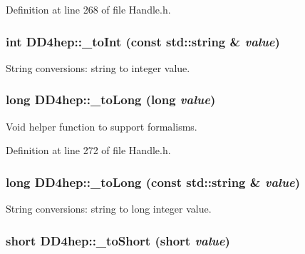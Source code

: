 Definition at line 268 of file Handle.h.\hypertarget{group___d_d4_h_e_p___g_e_o_m_e_t_r_y_ga6222fc401a48bcb4a2c176291bf4821b}{
\subsubsection[{\_\-toInt}]{\setlength{\rightskip}{0pt plus 5cm}int DD4hep::\_\-toInt (const std::string \& {\em value})}}
\label{group___d_d4_h_e_p___g_e_o_m_e_t_r_y_ga6222fc401a48bcb4a2c176291bf4821b}


String conversions: string to integer value. \hypertarget{group___d_d4_h_e_p___g_e_o_m_e_t_r_y_ga23a2ee3f07c47743d8a313babfb82841}{
\subsubsection[{\_\-toLong}]{\setlength{\rightskip}{0pt plus 5cm}long DD4hep::\_\-toLong (long {\em value})}}
\label{group___d_d4_h_e_p___g_e_o_m_e_t_r_y_ga23a2ee3f07c47743d8a313babfb82841}


Void helper function to support formalisms. 

Definition at line 272 of file Handle.h.\hypertarget{group___d_d4_h_e_p___g_e_o_m_e_t_r_y_ga76414f0a43017580942c20cd07143439}{
\subsubsection[{\_\-toLong}]{\setlength{\rightskip}{0pt plus 5cm}long DD4hep::\_\-toLong (const std::string \& {\em value})}}
\label{group___d_d4_h_e_p___g_e_o_m_e_t_r_y_ga76414f0a43017580942c20cd07143439}


String conversions: string to long integer value. \hypertarget{group___d_d4_h_e_p___g_e_o_m_e_t_r_y_ga08bead9e87f71537d8ef0eebb368b386}{
\subsubsection[{\_\-toShort}]{\setlength{\rightskip}{0pt plus 5cm}short DD4hep::\_\-toShort (short {\em value})}}
\label{group___d_d4_h_e_p___g_e_o_m_e_t_r_y_ga08bead9e87f71537d8ef0eebb368b386}


